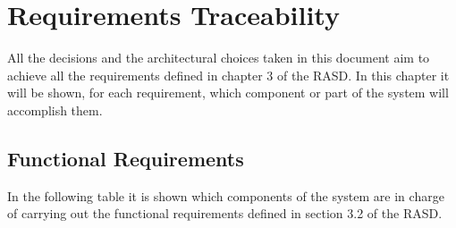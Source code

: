 \documentclass{report}
\begin{document}
\chapter{Requirements Traceability}
All the decisions and the architectural choices taken in this document aim to achieve all the requirements defined in chapter 3 of the RASD. In this chapter it will be shown, for each requirement, which component or part of the system will accomplish them.

\section{Functional Requirements}
In the following table it is shown which components of the system are in charge of carrying out the functional requirements defined in section 3.2 of the RASD.
\end{document}
